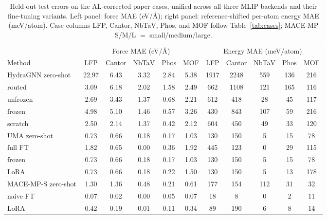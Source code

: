 \documentclass[conference]{IEEEtran}
\def\acs#1{#1}%
\begin{document}
\iffalse
\begin{table}[t]
\centering
\footnotesize
\setlength{\tabcolsep}{4.5pt}
\caption{Held-out test errors on the \acs{AL}-corrected paper cases,
unified across all three \acs{MLIP} backends and their fine-tuning variants.
Left panel: force \acs{MAE} (eV/\AA); right panel: reference-shifted per-atom
energy \acs{MAE} (meV/atom). Case columns LFP, Cantor, NbTaV, Phos, and MOF
follow Table~\ref{tab:cases}; MACE-MP S/M/L $=$ small/medium/large.}
\label{tab:finetune}
\begin{tabular}{lccccc@{\hspace{1.5em}}ccccc}
\toprule
 & \multicolumn{5}{c}{Force \acs{MAE} (eV/\AA)} & \multicolumn{5}{c}{Energy \acs{MAE} (meV/atom)}\\
\cmidrule(lr){2-6}\cmidrule(lr){7-11}
Method & LFP & Cantor & NbTaV & Phos & MOF & LFP & Cantor & NbTaV & Phos & MOF\\
\midrule
HydraGNN zero-shot   & 22.97 & 6.43 & 3.32 & 2.84 & 5.38 & 1917 & 2248 & 559 & 136 & 216 \\
\quad routed         & 3.09  & 6.18 & 2.02 & 1.58 & 2.49 & 662  & 1108 & 121 & 165 & 116 \\
\quad unfrozen       & 2.69  & 3.43 & 1.37 & 0.68 & 2.21 & 612  & 418  & 28  & 45  & 117 \\
\quad frozen         & 4.98  & 5.10 & 1.46 & 0.57 & 3.26 & 430  & 843  & 107 & 59  & 216 \\
\quad scratch        & 2.50  & 2.14 & 1.37 & 0.42 & 2.12 & 604  & 450  & 49  & 33  & 120 \\
\addlinespace
UMA zero-shot        & 0.73 & 0.66 & 0.18 & 0.17 & 1.03 & 130 & 150 & 5  & 15 & 78  \\
\quad full FT        & 1.82 & 0.65 & 0.00 & 0.36 & 1.92 & 445 & 123 & 0  & 29 & 115 \\
\quad frozen         & 0.73 & 0.66 & 0.18 & 0.17 & 1.03 & 130 & 150 & 5  & 15 & 78  \\
\quad LoRA           & 0.73 & 0.66 & 0.18 & 0.22 & 1.50 & 130 & 150 & 5  & 13 & 178 \\
\addlinespace
MACE-MP-S zero-shot  & 1.30 & 1.36 & 0.48 & 0.21 & 0.61 & 177 & 154 & 112 & 31 & 32 \\
\quad naive FT       & 0.07 & 0.02 & 0.00 & 0.05 & 0.07 & 18  & 8   & 0   & 2  & 11 \\
\quad LoRA           & 0.42 & 0.19 & 0.01 & 0.11 & 0.34 & 89  & 190 & 6   & 8  & 14 \\

\end{tabular}
\end{table}
\end{document}
